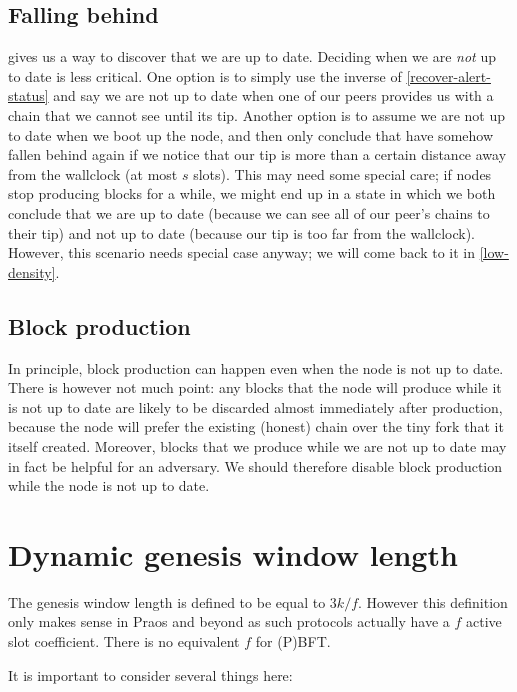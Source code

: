 \subsection{Falling behind}

 gives us a way to discover that we are up to date.
Deciding when we are \emph{not} up to date is less critical. One option is to
simply use the inverse of \cref{recover-alert-status} and say we are not up to
date when one of our peers provides us with a chain that we cannot see until its
tip.  Another option is to assume we are not up to date when we boot up the
node, and then only conclude that have somehow fallen behind again if we notice
that our tip is more than a certain distance away from the wallclock (at most
$s$ slots). This may need some special care; if nodes stop producing blocks for
a while, we might end up in a state in which we both conclude that we are up to
date (because we can see all of our peer's chains to their tip) and not up to
date (because our tip is too far from the wallclock). However, this scenario
needs special case anyway; we will come back to it in \cref{low-density}.

\subsection{Block production}

In principle, block production can happen even when the node is not up to date.
There is however not much point: any blocks that the node will produce while it
is not up to date are likely to be discarded almost immediately after
production, because the node will prefer the existing (honest) chain over the
tiny fork that it itself created. Moreover, blocks that we produce while we are
not up to date may in fact be helpful for an adversary. We should therefore
disable block production while the node is not up to date.

\section{Dynamic genesis window length}

The genesis window length is defined to be equal to $3k/f$. However this
definition only makes sense in Praos and beyond as such protocols actually have
a $f$ active slot coefficient. There is no equivalent $f$ for (P)BFT.

It is important to consider several things here:

